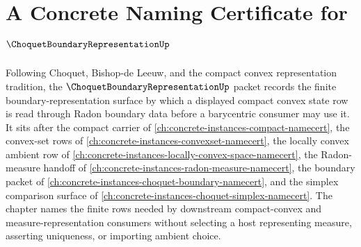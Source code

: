 \chapter{A Concrete Naming Certificate for $\ChoquetBoundaryRepresentationUp$}
\label{ch:concrete-instances-choquet-boundary-representation-namecert}

Following Choquet, Bishop-de Leeuw, and the compact convex representation tradition, the $\ChoquetBoundaryRepresentationUp$ packet records the finite boundary-representation surface by which a displayed compact convex state row is read through Radon boundary data before a barycentric consumer may use it. It sits after the compact carrier of \autoref{ch:concrete-instances-compact-namecert}, the convex-set rows of \autoref{ch:concrete-instances-convexset-namecert}, the locally convex ambient row of \autoref{ch:concrete-instances-locally-convex-space-namecert}, the Radon-measure handoff of \autoref{ch:concrete-instances-radon-measure-namecert}, the boundary packet of \autoref{ch:concrete-instances-choquet-boundary-namecert}, and the simplex comparison surface of \autoref{ch:concrete-instances-choquet-simplex-namecert}. The chapter names the finite rows needed by downstream compact-convex and measure-representation consumers without selecting a host representing measure, asserting uniqueness, or importing ambient choice.

